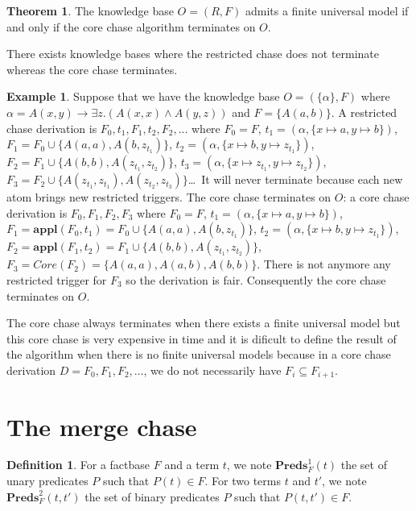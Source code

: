 \documentclass{article}
\theoremstyle{definition}
\newtheorem{definition}{Definition}[section]
\newtheorem{theorem}{Theorem}[section]
\newtheorem{example}{Example}[section]
\theoremstyle{remark}
\newcommand{\Preds}{\textbf{Preds}}
\newcommand{\Appl}{\textbf{appl}}
\begin{document}
\begin{theorem}
The knowledge base $O = (R,F)$ admits a finite universal model if and only if the core chase algorithm terminates on $O$.
\end{theorem}


There exists knowledge bases where the restricted chase does not terminate whereas the core chase terminates. \begin{example}
Suppose that we have the knowledge base $O=(\{\alpha\},F)$ where $\alpha = A(x,y) \rightarrow \exists z.(A(x,x) \wedge A(y,z))$ and $F =  \{A(a,b)\}$. A restricted chase derivation is $F_0,t_1,F_1,t_2,F_2,...$ where $F_0 = F$, $t_1=(\alpha,\{x \mapsto a, y \mapsto b\})$, $F_1= F_0 \cup \{A(a,a),A(b,z_{t_1})\}$, $t_2 = (\alpha,\{x \mapsto b, y \mapsto z_{t_1}\})$, $F_2 = F_1 \cup \{A(b,b),A(z_{t_1},z_{t_2})\}$, $t_3 = (\alpha,\{x \mapsto z_{t_1}, y \mapsto z_{t_2}\})$, $F_3 =  F_2 \cup \{A(z_{t_1},z_{t_1}),A(z_{t_2},z_{t_3})\}$\ldots\ It will never terminate because each new atom brings new restricted triggers. The core chase terminates on $O$: a core chase derivation is $F_0,F_1,F_2,F_3$ where $F_0=F$, $t_1=(\alpha,\{x \mapsto a, y \mapsto b\})$, $F_1=\Appl(F_0,t_1) =F_0 \cup \{A(a,a),A(b,z_{t_1})\}$, $t_2 = (\alpha,\{x \mapsto b, y \mapsto z_{t_1}\})$, $F_2 =\Appl(F_1,t_2) =F_1 \cup \{A(b,b),A(z_{t_1},z_{t_2})\}$, $F_3 = \textit{Core}(F_2)= \{A(a,a),A(a,b),A(b,b)\}$. 
There is not anymore any restricted trigger for $F_3$ so the derivation is fair. Consequently the core chase terminates on $O$.

\end{example}
The core chase always terminates when there exists a finite universal model but this core chase is very expensive in time and it is dificult to define the result of the algorithm when there is no finite universal models because in a core chase derivation $D = F_0, F_1, F_2, \ldots$, we do not necessarily have $F_i \subseteq F_{i+1}$. 

\section{The merge chase}


\begin{definition}
For a factbase $F$ and a term $t$, we note \emph{$\Preds^1_F(t)$} the set of unary predicates $P$ such that $P(t)\in F$. For two terms $t$ and $t'$, we note \emph{$\Preds^2_F(t,t')$} the set of binary predicates $P$ such that $P(t,t')\in F$.
\end{definition}
\end{document}

